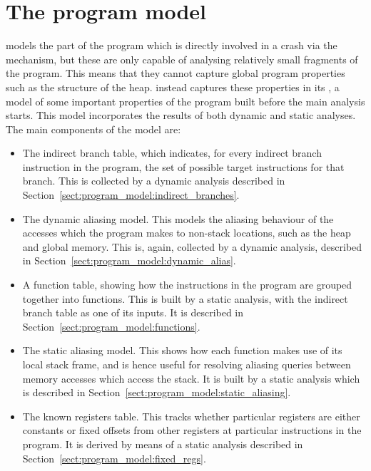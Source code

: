 \chapter{The program model}

{\Technique} models the part of the program which is directly involved
in a crash via the {\StateMachine} mechanism, but these are only
capable of analysing relatively small fragments of the program.  This
means that they cannot capture global program properties such as the
structure of the heap.  {\Technique} instead captures these properties
in its , a model of some important
properties of the program built before the main analysis starts.  This
model incorporates the results of both dynamic and static analyses.
The main components of the model are:

\begin{itemize}
\item The indirect branch table, which indicates, for every indirect
  branch instruction in the program, the set of possible target
  instructions for that branch.  This is collected by a dynamic
  analysis described in
  Section~\ref{sect:program_model:indirect_branches}.

\item The dynamic aliasing model.  This models the aliasing behaviour
  of the accesses which the program makes to non-stack locations, such
  as the heap and global memory.  This is, again, collected by a
  dynamic analysis, described in
  Section~\ref{sect:program_model:dynamic_alias}.

\item A function table, showing how the instructions in the program
  are grouped together into functions.  This is built by a static
  analysis, with the indirect branch table as one of its inputs.  It
  is described in Section~\ref{sect:program_model:functions}.

\item The static aliasing model.  This shows how each function makes
  use of its local stack frame, and is hence useful for resolving
  aliasing queries between memory accesses which access the stack.  It
  is built by a static analysis which is described in
  Section~\ref{sect:program_model:static_aliasing}.

\item The known registers table.  This tracks whether particular
  registers are either constants or fixed offsets from other registers
  at particular instructions in the program.  It is derived by means
  of a static analysis described in
  Section~\ref{sect:program_model:fixed_regs}.
\end{itemize}

